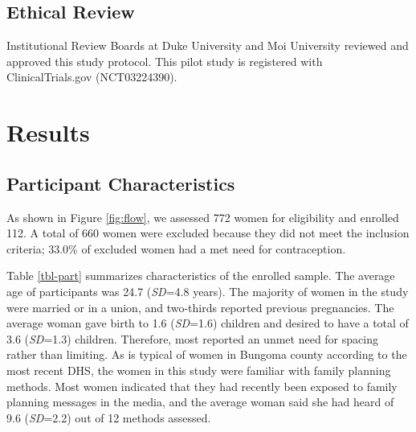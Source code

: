 \documentclass[man]{apa6}
\theoremstyle{definition}
\theoremstyle{definition}
\theoremstyle{definition}
\theoremstyle{remark}
\begin{document}
\hypertarget{ethical-review}{%
\subsection{Ethical Review}\label{ethical-review}}

Institutional Review Boards at Duke University and Moi University
reviewed and approved this study protocol. This pilot study is
registered with ClinicalTrials.gov (NCT03224390).

\hypertarget{results}{%
\section{Results}\label{results}}

\hypertarget{participant-characteristics}{%
\subsection{Participant
Characteristics}\label{participant-characteristics}}

As shown in Figure \ref{fig:flow}, we assessed 772 women for eligibility
and enrolled 112. A total of 660 women were excluded because they did
not meet the inclusion criteria; 33.0\% of excluded women had a met need
for contraception.

Table \ref{tbl-part} summarizes characteristics of the enrolled sample.
The average age of participants was 24.7 (\emph{SD}=4.8 years). The
majority of women in the study were married or in a union, and
two-thirds reported previous pregnancies. The average woman gave birth
to 1.6 (\emph{SD}=1.6) children and desired to have a total of 3.6
(\emph{SD}=1.3) children. Therefore, most reported an unmet need for
spacing rather than limiting. As is typical of women in Bungoma county
according to the most recent DHS, the women in this study were familiar
with family planning methods. Most women indicated that they had
recently been exposed to family planning messages in the media, and the
average woman said she had heard of 9.6 (\emph{SD}=2.2) out of 12
methods assessed.
\end{document}

